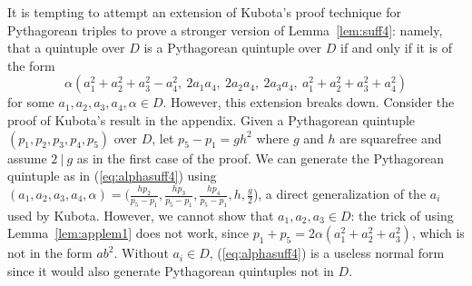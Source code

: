 \begin{rmk}
It is tempting to attempt an extension of Kubota's proof technique 
for Pythagorean triples to prove a stronger version of Lemma~\ref{lem:suff4}:
namely, that a quintuple over $D$ is a Pythagorean quintuple over $D$ if and
only if it is of the form  
\begin{equation}
\label{eq:alphasuff4}
	\alpha (a_1^2 + a_2^2 + a_3^2 - a_4^2,\ 2a_1a_4,\ 2a_2a_4,\ 2a_3a_4,\ 
	 a_1^2 + a_2^2 + a_3^2 + a_4^2)
\end{equation}
for some $a_1,a_2,a_3,a_4,\alpha \in D$.
However, this extension breaks down.
Consider the proof of Kubota's result in the appendix.
Given a Pythagorean quintuple $(p_1,p_2,p_3,p_4,p_5)$ over $D$,
let $p_5 - p_1 = gh^2$ where $g$ and $h$ are squarefree and assume
$2 \ | \ g$ as in the first case of the proof.
We can generate the Pythagorean quintuple 
as in (\ref{eq:alphasuff4}) using $(a_1,a_2,a_3,a_4,\alpha) = 
(\frac{hp_2}{p_5 - p_1}, \frac{hp_3}{p_5 - p_1}, \frac{hp_4}{p_5 - p_1}, 
h, \frac{g}{2}$),
a direct generalization of the $a_i$ used by Kubota.
However, we cannot show that $a_1,a_2,a_3 \in D$:
the trick of using Lemma~\ref{lem:applem1} does not work, 
since $p_1 + p_5 = 2\alpha(a_1^2 + a_2^2 + a_3^2)$,
which is not in the form $ab^2$.
Without $a_i \in D$, (\ref{eq:alphasuff4}) is a useless normal form
since it would also generate Pythagorean quintuples not in $D$.
\end{rmk}
